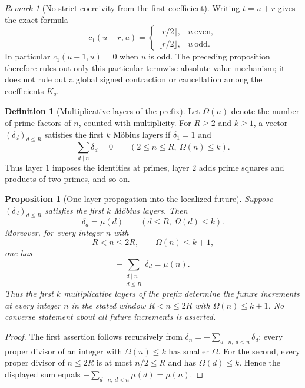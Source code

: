 \documentclass[11pt]{amsart}
\numberwithin{equation}{section}
\theoremstyle{plain}
\newtheorem{proposition}[theorem]{Proposition}
\theoremstyle{definition}
\newtheorem{definition}[theorem]{Definition}
\theoremstyle{remark}
\newtheorem{remark}[theorem]{Remark}
\begin{document}
\begin{remark}[No strict coercivity from the first coefficient]
\label{rem:c1-parity}
Writing $t=u+r$ gives the exact formula
\[
c_1(u+r,u)=
\begin{cases}
\lceil r/2\rceil,&u\ \text{even},\\
\lfloor r/2\rfloor,&u\ \text{odd}.
\end{cases}
\]
In particular $c_1(u+1,u)=0$ when $u$ is odd.  The preceding proposition
therefore rules out only this particular termwise absolute-value mechanism;
it does not rule out a global signed contraction or cancellation among the
coefficients $K_q$.
\end{remark}

\begin{definition}[Multiplicative layers of the prefix]
\label{def:multiplicative-layers}
Let $\Omega(n)$ denote the number of prime factors of $n$, counted with
multiplicity.  For $R\ge2$ and $k\ge1$, a vector
$(\delta_d)_{d\le R}$ satisfies the first $k$ M\"obius layers if
$\delta_1=1$ and
\[
\sum_{d\mid n}\delta_d=0
\qquad(2\le n\le R,\ \Omega(n)\le k).
\]
Thus layer $1$ imposes the identities at primes, layer $2$ adds prime
squares and products of two primes, and so on.
\end{definition}

\begin{proposition}[One-layer propagation into the localized future]
\label{prop:layer-propagation}
Suppose $(\delta_d)_{d\le R}$ satisfies the first $k$ M\"obius layers. Then
\[
\delta_d=\mu(d)\qquad(d\le R,\ \Omega(d)\le k).
\]
Moreover, for every integer $n$ with
\[
R<n\le2R,\qquad\Omega(n)\le k+1,
\]
one has
\[
-\sum_{\substack{d\mid n\\d\le R}}\delta_d=\mu(n).
\]
Thus the first $k$ multiplicative layers of the prefix determine the
future increments at every integer $n$ in the stated window
$R<n\le2R$ with $\Omega(n)\le k+1$.  No converse statement about all
future increments is asserted.
\end{proposition}

\begin{proof}
The first assertion follows recursively from
$\delta_n=-\sum_{d\mid n,\ d<n}\delta_d$: every proper divisor of an
integer with $\Omega(n)\le k$ has smaller $\Omega$.  For the second, every
proper divisor of $n\le2R$ is at most $n/2\le R$ and has
$\Omega(d)\le k$.  Hence the displayed sum equals
$-\sum_{d\mid n,\ d<n}\mu(d)=\mu(n)$.
\end{proof}
\end{document}
